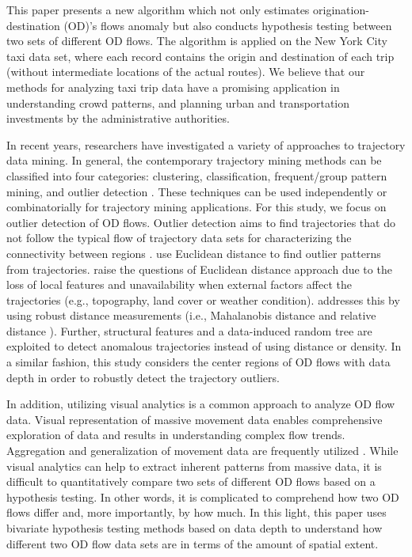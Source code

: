\documentclass[a4paper,UKenglish]{lipics-v2016}
\begin{document}
This paper presents a new algorithm which not only estimates origination-destination (OD)'s flows anomaly but also conducts hypothesis testing between two sets of different OD flows. The algorithm is applied on the New York City taxi data set, where each record contains the origin and destination of each trip (without intermediate locations of the actual routes).
We believe that our methods for analyzing taxi trip data have a promising application in understanding crowd patterns, and planning urban and transportation investments by the administrative authorities.

In recent years, researchers have investigated a variety of approaches to trajectory data mining.
In general, the contemporary trajectory mining methods can be classified into four categories: clustering, classification, frequent/group pattern mining, and outlier detection \cite{mazimpaka16JOSIS,zheng15ACMTIST}. These techniques can be used independently or combinatorially for trajectory mining applications. For this study, we focus on outlier detection of OD flows. Outlier detection aims to find trajectories that do not follow the typical flow of trajectory data sets for characterizing the connectivity between regions \cite{mazimpaka16JOSIS}. \cite{fontes13GeoInfo,lee08ICDE} use Euclidean distance to find outlier patterns from trajectories. \cite{pan13ACMGIS,liu12IJGIS} raise the questions of Euclidean distance approach due to the loss of local features and unavailability when external factors affect the trajectories (e.g., topography, land cover or weather condition).  \cite{pan13ACMGIS,liu12IJGIS} addresses this by using robust distance measurements (i.e., Mahalanobis distance \cite{pan13ACMGIS} and relative distance \cite{liu12IJGIS}). Further, structural features \cite{yuan11JCIS} and a data-induced random tree  \cite{zhang11UC} are exploited to detect anomalous trajectories instead of using distance or density. In a similar fashion, this study considers the center regions of OD flows with data depth in order to robustly detect the trajectory outliers. 

In addition, utilizing visual analytics is a common approach to analyze OD flow data.
Visual representation of massive movement data enables comprehensive exploration of data and results in understanding complex flow trends.
Aggregation and generalization of movement data are frequently utilized \cite{andrienko08VAST,adrienko11IEEETVCG,guo14IEEETVCG}.
While visual analytics can help to extract inherent patterns from massive data, it is difficult to quantitatively compare two sets of different OD flows based on a hypothesis testing.
In other words, it is complicated to comprehend how two OD flows differ and, more importantly, by how much.
In this light, this paper uses bivariate hypothesis testing methods based on data depth to understand how different two OD flow data sets are in terms of the amount of spatial extent. 
\end{document}
